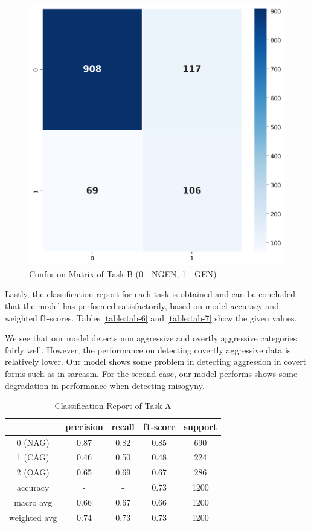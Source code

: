 \documentclass[conference]{IEEEtran}
\begin{document}
\begin{figure}[t!]
    \centering
    \includegraphics[scale=0.5]{assets/heatmap_task_B.png}
    \caption{Confusion Matrix of Task B (0 - NGEN, 1 - GEN)}
    \label{fig:heatmapB}
\end{figure}

Lastly, the classification report for each task is obtained and can be concluded that the model has performed satisfactorily, based on model accuracy and weighted f1-scores. Tables \eqref{table:tab-6} and \eqref{table:tab-7} show the given values.

We see that our model detects non aggressive and overtly aggressive categories fairly well. However, the performance on detecting covertly aggressive data is relatively lower. Our model shows some problem in detecting aggression in covert forms such as in sarcasm. For the second case, our model performs shows some degradation in performance when detecting misogyny. 

\begin{table}[t]
\caption{Classification Report of Task A}
\label{table:tab-6}
\centering
    \begin{tabular}{|c|c|c|c|c|}
        \hline
        \textbf{ } & \textbf{precision} & \textbf{recall} & \textbf{f1-score}  & \textbf{support}\\
        \hline
        0 (NAG) & 0.87 & 0.82 & 0.85 & 690   \\
        1 (CAG) & 0.46 & 0.50 & 0.48 & 224   \\
        2 (OAG) & 0.65 & 0.69 & 0.67 & 286   \\
        accuracy & - & - & 0.73 & 1200 \\
   macro avg & 0.66 & 0.67 & 0.66 & 1200 \\ 
weighted avg & 0.74 & 0.73 & 0.73 & 1200 \\
        \hline
    \end{tabular}
\end{table}
\end{document}
